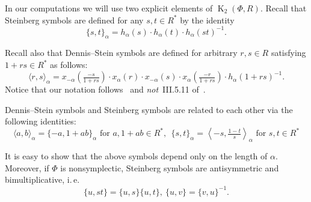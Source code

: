 \documentclass[oneside, 8pt]{amsart}
\theoremstyle{remark}
\theoremstyle{definition}
\DeclareMathOperator{\K}{K}
\numberwithin{equation}{section}
\begin{document}
In our computations we will use two explicit elements of $\K_2(\Phi, R)$. Recall that Steinberg symbols are defined for any $s, t \in R^*$ by the identity
\begin{equation} \label{eq:steinberg} \{ s, t \}_\alpha = h_\alpha(s) \cdot h_\alpha(t) \cdot h_\alpha(st)^{-1}. \end{equation}

Recall also that Dennis--Stein symbols are defined for arbitrary $r, s\in R$ satisfying $1 + rs \in R^*$ as follows:
\begin{equation} \label{eq:dennis-stein}
 \langle r,s \rangle _ \alpha = x_{-\alpha}\left(\tfrac{- s}{1 + rs}\right) \cdot x_{\alpha}(r) \cdot x_{-\alpha}(s) \cdot x_{\alpha}\left(\tfrac{- r}{1+rs}\right) \cdot h_{\alpha}(1 + rs)^{-1}.
\end{equation} 
Notice that our notation follows~\cite{DS73} and {\it not}~III.5.11 of~\cite{Kbook}.

Dennis--Stein symbols and Steinberg symbols are related to each other via the following identities:
\begin{equation} \label{DS-S-relationship} \langle a, b \rangle_\alpha = \{-a, 1+ab\}_\alpha\text{ for } a, 1+ab\in R^*,\ \
 \{ s, t \}_\alpha = \left\langle -s, \tfrac{1 - t}{s} \right\rangle_\alpha\text{ for } s, t\in R^* \end{equation}

It is easy to show that the above symbols depend only on the length of $\alpha$.
Moreover, if $\Phi$ is nonsymplectic, Steinberg symbols are antisymmetric and bimultiplicative, i.\,e. \begin{equation} \label{eq:symbol-properties} \{ u, st \} = \{ u, s\} \{ u, t \}, \ \{ u, v \} = \{ v, u\}^{-1}. \end{equation}

\begin{comment}
Suppose for a moment that $\langle \alpha, \beta \rangle = -1$ and  $\langle \beta, \alpha \rangle = -1$ then
\[ \{s, t^{-1} \} = \{s,  t^{-1}\}_\alpha = \{t, s^{-1} \}_\beta^{-1} = \{s^{-1}, t\} \]
In particular, $\{s, s^{-1}\} = \{s, s^{-1}\}^{-1}$ 
\end{comment}
\end{document}
